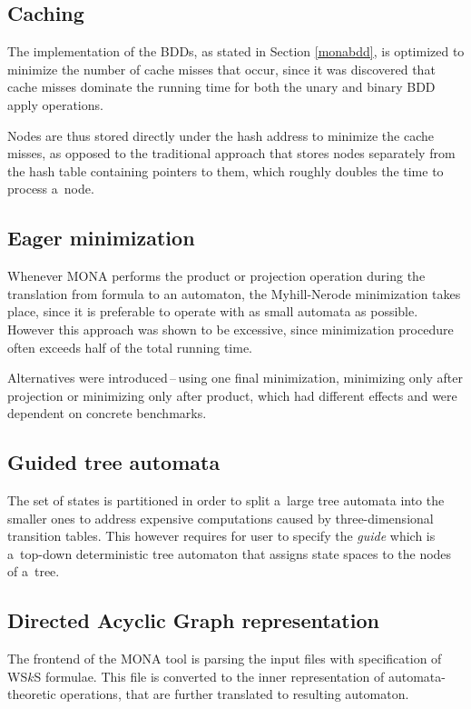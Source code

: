 \subsection{Caching}
The implementation of the BDDs, as stated in Section \ref{monabdd}, is optimized
to minimize the number of cache misses that occur, since it was discovered that
cache misses dominate the running time for both the unary and binary BDD apply
operations.

Nodes are thus stored directly under the hash address to minimize the cache
misses, as opposed to the traditional approach that stores nodes separately from
the hash table containing pointers to them, which roughly doubles the time to
process a~node.

\subsection{Eager minimization}
Whenever MONA performs the product or projection operation during the
translation from formula to an automaton, the Myhill-Nerode minimization takes
place, since it is preferable to operate with as small automata as possible.
However this approach was shown to be excessive, since minimization procedure
often exceeds half of the total running time.

Alternatives were introduced\,--\,using one final minimization, minimizing only
after projection or minimizing only after product, which had different effects
and were dependent on concrete benchmarks.

\subsection{Guided tree automata}

The set of states is partitioned in order to split a~large tree automata into
the smaller ones to address expensive computations caused by three-dimensional
transition tables. This however requires for user to specify the \emph{guide}
which is a~top-down deterministic tree automaton that assigns state spaces to
the nodes of a~tree.

\subsection{Directed Acyclic Graph representation}\label{dag}

The frontend of the MONA tool is parsing the input files with specification of
WS$k$S formulae. This file is converted to the inner representation of
automata-theoretic operations, that are further translated to resulting
automaton.

